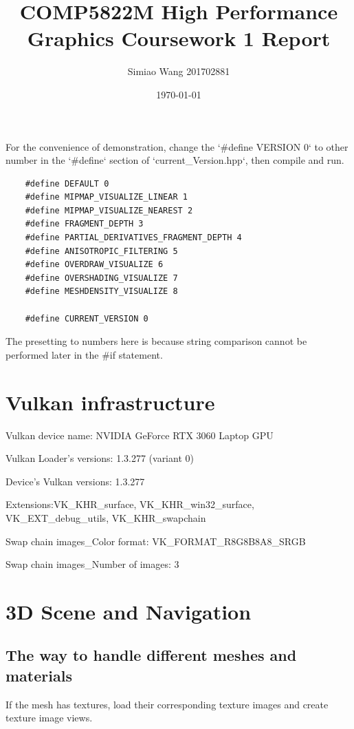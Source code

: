 \documentclass[10pt]{article}
\title{COMP5822M High Performance Graphics Coursework 1 Report}
\author{Simiao Wang 201702881}
\date{\today}
\begin{document}
\maketitle

\noindent For the convenience of demonstration, change the `\#define VERSION 0` to other number in the `\#define` section of `current\_Version.hpp`, then compile and run.

\begin{lstlisting}
    #define DEFAULT 0
    #define MIPMAP_VISUALIZE_LINEAR 1
    #define MIPMAP_VISUALIZE_NEAREST 2
    #define FRAGMENT_DEPTH 3
    #define PARTIAL_DERIVATIVES_FRAGMENT_DEPTH 4
    #define ANISOTROPIC_FILTERING 5
    #define OVERDRAW_VISUALIZE 6
    #define OVERSHADING_VISUALIZE 7
    #define MESHDENSITY_VISUALIZE 8
    
    #define CURRENT_VERSION 0
\end{lstlisting}

\noindent The presetting to numbers here is because string comparison cannot be performed later in the \#if statement.

\section{Vulkan infrastructure}

\noindent Vulkan device name: NVIDIA GeForce RTX 3060 Laptop GPU

\noindent Vulkan Loader's versions: 1.3.277 (variant 0)

\noindent Device's Vulkan versions: 1.3.277

\noindent Extensions:VK\_KHR\_surface, VK\_KHR\_win32\_surface, VK\_EXT\_debug\_utils, VK\_KHR\_swapchain

\noindent Swap chain images\_Color format: VK\_FORMAT\_R8G8B8A8\_SRGB

\noindent Swap chain images\_Number of images: 3

\section{3D Scene and Navigation}

\subsection{The way to handle different meshes and materials}

\noindent If the mesh has textures, load their corresponding texture images and create texture image views.
\end{document}

